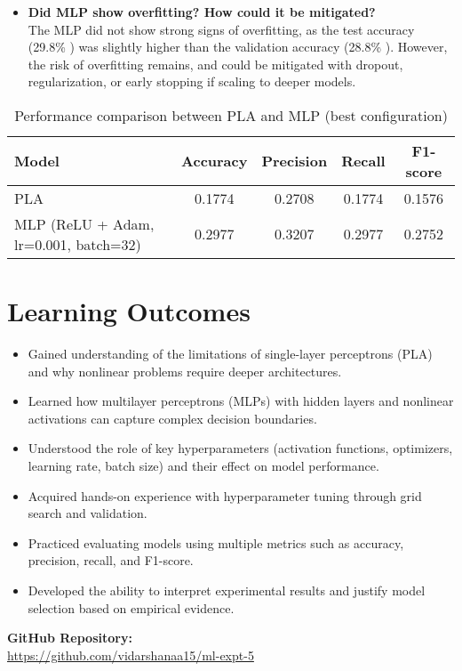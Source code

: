 \documentclass[11pt]{article}
\begin{document}
\begin{itemize}
    \item \textbf{Did MLP show overfitting? How could it be mitigated?} \\
    The MLP did not show strong signs of overfitting, as the test accuracy (29.8\% ) was slightly higher than the validation accuracy (28.8\% ). However, the risk of overfitting remains, and could be mitigated with dropout, regularization, or early stopping if scaling to deeper models.
\end{itemize}

\vspace{1cm}
\begin{table}[H]
\centering
\caption{Performance comparison between PLA and MLP (best configuration)}
\begin{tabular}{|l|c|c|c|c|}
\hline
\textbf{Model} & \textbf{Accuracy} & \textbf{Precision} & \textbf{Recall} & \textbf{F1-score} \\ \hline
PLA  & 0.1774 & 0.2708 & 0.1774 & 0.1576 \\ \hline
MLP (ReLU + Adam, lr=0.001, batch=32) & 0.2977 & 0.3207 & 0.2977 & 0.2752 \\ \hline
\end{tabular}
\end{table}


\vspace{3cm}
\section{Learning Outcomes}
\begin{itemize}
    \item Gained understanding of the limitations of single-layer perceptrons (PLA) and why nonlinear problems require deeper architectures.  
    \item Learned how multilayer perceptrons (MLPs) with hidden layers and nonlinear activations can capture complex decision boundaries.  
    \item Understood the role of key hyperparameters (activation functions, optimizers, learning rate, batch size) and their effect on model performance.  
    \item Acquired hands-on experience with hyperparameter tuning through grid search and validation.  
    \item Practiced evaluating models using multiple metrics such as accuracy, precision, recall, and F1-score.  
    \item Developed the ability to interpret experimental results and justify model selection based on empirical evidence.  
\end{itemize}


\vspace{1cm}
\noindent
\textbf{GitHub Repository:} \\
\href{https://github.com/vidarshanaa15/ml-expt-5}{https://github.com/vidarshanaa15/ml-expt-5}
\end{document}
